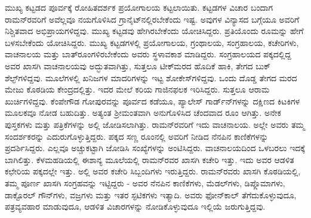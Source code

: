 ಮುಖ್ಯ ಕಟ್ಟಡದ ಪೂರ್ವಕ್ಕೆ ರೋಹಿತದರ್ಶಕ ಪ್ರಯೋಗಾಲಯ ಕಟ್ಟಲಾಯಿತು. ಕಟ್ಟಡಗಳ ವಿಚಾರ ಬಂದಾಗ ರಾಮನ್‍ರವರಿಗೆ ಅವೆಲ್ಲವೂ ನಯಗೊಳಿಸಿದ ಗ್ರಾನೈಟ್‍ನಲ್ಲಿರಬೇಕೆಂದು ಇಷ್ಟ. ಅವುಗಳ ವಿನ್ಯಾಸದ ಬಗ್ಗೆಯೂ ಅವರಿಗೆ ನಿಶ್ಚಿತವಾದ ಅಭಿಪ್ರಾಯಗಳಿದ್ದವು. ಮುಖ್ಯ ಕಟ್ಟಡವು ಹೇಗಿರಬೇಕೆಂದು ಯೋಚಿಸಿದ್ದರು. ಪ್ರತಿಯೊಂದು ರೂಮನ್ನು ಹೇಗೆ ಬಳಸಬೇಕೆಂದು ಯೋಚಿಸಿದ್ದರು. ಮುಖ್ಯ ಕಟ್ಟಡಗಳಲ್ಲಿ ಪ್ರಯೋಗಾಲಯ, ಗ್ರಂಥಾಲಯ, ಸಂಗ್ರಹಾಲಯ, ಕಚೇರಿಗಳು, ವಾಚನಾಲಯ ಮತ್ತು ಬಾತ್‍ರೂಂಗಳಿರಬೇಕೆಂದು ಅವರು ಸ್ಥಳಾವಕಾಶ ಮಾಡಿದ್ದರು. ಸಂಗ್ರಹಾಲಯದ ಪಕ್ಕದಲ್ಲಿದ್ದ ಅವರ ಖಾಸಗಿ ವಾಚನಾಲಯವು ಅದ್ಭುತವಾಗಿತ್ತು, ಸುತ್ತಲೂ ಟೀಕ್‍ಮರದ ಹೊದಿಕೆ ಹಾಕಿ, ತೇಗದ ಬುಕ್ ಶೆಲ್ಫ್‌ಗಳಿದ್ದವು. ಮೂಲೆಗಳಲ್ಲಿ ಖನಿಜಗಳ ಮಾದರಿಗಳನ್ನು ಇಟ್ಟ ಶೋಕೇಸ್‍ಗಳಿದ್ದವು. ಒಂದು ದೊಡ್ಡ ತೇಗದ ಮರದ ಮೇಜು ಕೊಠಡಿಯ ಕೇಂದ್ರದಲ್ಲಿತ್ತು. ಇದರ ಮೇಲೆ ಕರಿಯ ಗಾಜಿನಫಲಕ ಇರಿಸಿದ್ದರು. ಸುತ್ತಲೂ ಆರಾಮ ಖುರ್ಚಿಗಳಿದ್ದವು. ಕೆಂಪೇಗೌಡ ಗೋಪುರವನ್ನು ಪೂರ್ವದ ಕಡೆಯೂ, ಪ್ಯಾಲೇಸ್ ಗಾರ್ಡ್‌ನ್‍ಗಳನ್ನು ದಕ್ಷಿಣದ ಕಿಟಕಿಗಳ ಮೂಲಕವೂ ನೋಡ ಬಹುದಿತ್ತು. ಅತ್ಯಂತ ಶ‍್ರೀಮಂತವಾಗಿ ಅನುಗೊಳಿಸಿದ ಚೆಂದವಾದ ರೂಂ ಆಗಿತ್ತು. ಅನೇಕ ಪುಸ್ತಕಗಳು ಮತ್ತು ಪತ್ರಿಕೆಗಳನ್ನು ಅಲ್ಲಿ ಜೋಡಿಸಲಾಗಿತ್ತು. ರಾಮನ್‍ರವರಿಗೆ ಇದು ವಾಚನಾಲಯ. ಅಲ್ಲೇ ಅವರು ತಮ್ಮ ಸಂದರ್ಶಕರನ್ನು ಎದುರುಗೊಳ್ಳುತ್ತಿದ್ದರು. ಪಕ್ಕದ ಸಣ್ಣ ರೂಂನಲ್ಲಿ ಅವರಿಗೆ ನೀಡಿದ ನೆನಪಿನ ಕಾಣಿಕೆಗಳನ್ನು ಪ್ರದರ್ಶಿಸಿದ್ದರು. ಎಲ್ಲವೂ ಅಚ್ಚುಕಟ್ಟಾಗಿ ಜೋಡಿಸಿ ಸಂಖ್ಯೆಗಳನ್ನು ಅಂಟಿಸಿದ್ದರು. ವಾಚನಾಲಯದಿಂದ ಒಳಬರಲು ಇದಕ್ಕೆ ಬಾಗಿಲಿತ್ತು. ಕೆಳಮಹಡಿಯಲ್ಲಿ ಈಶಾನ್ಯ ಮೂಲೆಯಲ್ಲಿ ರಾಮನ್‍ರವರ ಖಾಸಗಿ ಕಚೇರಿ ಇತ್ತು. ಇದು ಅವರ ಆಡಳಿತ ಕಛೇರಿಯ ಪಕ್ಕದಲ್ಲೇ ಇತ್ತು. ಅಲ್ಲಿ ಅವರ ಕಚೇರಿ ಸಿಬ್ಬಂದಿಗಳು ಇರುತ್ತಿದ್ದರು. ರಾಮನ್‍ರವರು ಖಾಸಗಿ ಕೊಠಡಿಯಲ್ಲಿ, ತಮ್ಮ ಪೂರ್ಣ ಖಾಸಗಿ ಸಂಗ್ರಹವನ್ನು ಇಟ್ಟಿದ್ದರು - ಅವರ ನೆನಪಿನ ಕಾಣಿಕೆಗಳು, ಮೆಡಲ್‍ಗಳು, ಡಿಪ್ಲೊಮಾಗಳು, ಡಾಕ್ಟೊರಲ್ ಗೌನ್‍ಗಳು, ವಜ್ರಗಳು ಮತ್ತು ಇತರ ಸ್ಫಟಿಕಗಳು ಇತ್ಯಾದಿ. ಅವರು ಫೋನ್‍ಕಾಲ್ ತೆಗೆದುಕೊಳ್ಳುವುದೂ, ಪತ್ರವ್ಯವಹಾರ ಮಾಡುವುದೂ, ಆಡಳಿತ ವಿಚಾರಗಳನ್ನು ನೋಡಿಕೊಳ್ಳುವುದೂ ಇಲ್ಲಿಯೆ ಜರುಗುತ್ತಿದ್ದವು.

